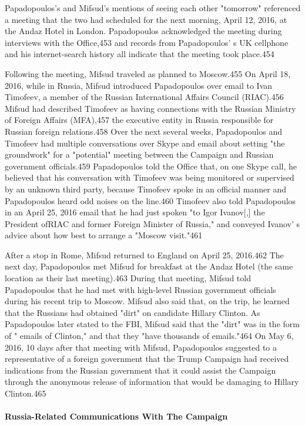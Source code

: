 Papadopoulos's and Mifsud's mentions of seeing each other "tomorrow" referenced a meeting that the two had scheduled for the next morning, April 12, 2016, at the Andaz Hotel in London. Papadopoulos acknowledged the meeting during interviews with the Office,453 and records from Papadopoulos' s  UK cellphone and his internet-search history all indicate that the meeting took place.454

Following the meeting,  Mifsud traveled as planned to Moscow.455 On April 18,  2016, while in Russia, Mifsud introduced Papadopoulos over email to Ivan Timofeev, a member of the Russian International Affairs Council (RIAC).456 Mifsud had described Timofeev as having connections with the Russian Ministry of Foreign Affairs (MFA),457 the executive entity in Russia responsible for Russian foreign relations.458 Over the next several weeks, Papadopoulos and Timofeev had multiple conversations over Skype and email about setting "the groundwork" for a "potential" meeting between the Campaign and Russian government officials.459 Papadopoulos told the Office that, on one Skype call, he believed that his conversation with Timofeev was being monitored or supervised by an unknown third party, because Timofeev spoke in an official manner and Papadopoulos heard odd noises on the line.460 Timofeev also told Papadopoulos in an April 25, 2016 email that he had just spoken "to Igor Ivanov[,] the President ofRIAC and former Foreign Minister of Russia," and conveyed Ivanov' s advice about how best to arrange a "Moscow visit."461

After a  stop in Rome,  Mifsud returned to England on April  25,  2016.462 The next day, Papadopoulos met Mifsud for breakfast at the Andaz Hotel (the same location as their last meeting).463 During that meeting, Mifsud told Papadopoulos that he had met with high-level Russian government officials during his recent trip to Moscow.  Mifsud also said that, on the trip, he learned that the Russians had obtained "dirt" on candidate Hillary Clinton. As Papadopoulos later stated to the FBI, Mifsud said that the "dirt" was in the form of " emails of Clinton," and that they "have thousands of emails."464 On May 6, 2016, 10 days after that meeting with Mifsud, Papadopoulos suggested to a representative of a foreign government that the Trump Campaign had received indications from the Russian government that it  could assist the Campaign through the anonymous release of information that would be damaging to Hillary Clinton.465

\paragraph{Russia-Related Communications With The Campaign}

